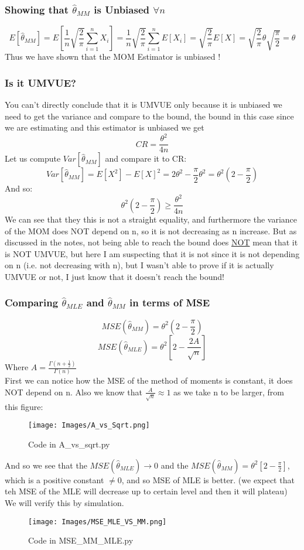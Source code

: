 \documentclass[12pt]{article}
\begin{document}
\subsubsection*{Showing that $\hat{\theta}_{MM}$ is Unbiased $\forall n$}
\[
E[\hat{\theta}_{MM}] = E[\frac{1}{n}\sqrt{\frac{2}{\pi}}\sum_{i=1}^{n}X_i] =\frac{1}{n}\sqrt{\frac{2}{\pi}}\sum_{i=1}^{n}E[X_i] = \sqrt{\frac{2}{\pi}}E[X] = \sqrt{\frac{2}{\pi}}\theta\sqrt{\frac{\pi}{2}} = \theta
\]
Thus we have shown that the MOM Estimator is unbiased ! 
\subsubsection*{Is it UMVUE?}
You can't directly conclude that it is UMVUE only because it is unbiased we need to get the variance and compare to the bound, the bound in this case since we are estimating and this estimator is unbiased we get 
\[
CR = \frac{\theta^2}{4n}
\]
Let us compute $Var[\hat{\theta}_{MM}]$ and compare it to CR: 
\[
Var[\hat{\theta}_{MM}] = E[X^2] - E[X]^2 = 2\theta^2 - \frac{\pi}{2}\theta^2 = \theta^2(2-\frac{\pi}{2})
\]
And so: 
\[
  \theta^2(2-\frac{\pi}{2}) \geq\frac{\theta^2}{4n}
\]
We can see that they this is not a straight equality, and furthermore the variance of the MOM does NOT depend on n, so it is not decreasing as n increase. But as discussed in the notes, not being able to reach the bound does \underline{NOT} mean that it is NOT UMVUE, but here I am suspecting that it is not since it is not depending on n (i.e. not decreasing with n), but I wasn't able to prove if it is actually UMVUE or not, I just know that it doesn't reach the bound!
\subsubsection*{Comparing $\hat{\theta}_{MLE}$ and $\hat{\theta}_{MM}$ in terms of MSE}
\[
MSE(\hat{\theta}_{MM}) = \theta^2(2-\frac{\pi}{2})
\]
\[
MSE(\hat{\theta}_{MLE}) = \theta^2[2-\frac{2A}{\sqrt{n}}]
\]
Where $A= \frac{\Gamma(n+\frac{1}{2})}{\Gamma(n)}$\\ 
First we can notice how the MSE of the method of moments is constant, it does NOT depend on n. Also we know that $\frac{A}{\sqrt{n}} \approx 1 $ as we take n to be larger, from this figure: 
\begin{figure}[H]
  \centering
  \texttt{[image: Images/A\_vs\_Sqrt.png]}
  \caption{Code in A\_vs\_sqrt.py}
\end{figure}
And so we see that the $MSE(\hat{\theta}_{MLE}) \to 0$ and the $MSE(\hat{\theta}_{MM}) = \theta^2 [2-\frac{\pi}{2}]$, which is a positive constant $\neq 0$, and so MSE of MLE is better.
(we expect that teh MSE of the MLE will decrease up to certain level and then it will plateau) \\We will verify this by simulation.
\begin{figure}[H]
  \centering
  \texttt{[image: Images/MSE\_MLE\_VS\_MM.png]}
  \caption{Code in MSE\_MM\_MLE.py}
\end{figure}
\end{document}
